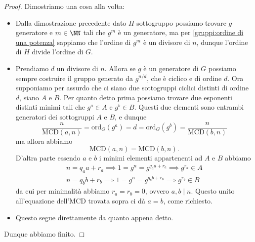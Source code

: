 \documentclass[11pt]{scrartcl}
\newcommand{\MCD}{\text{MCD}}
\newcommand{\ordine}[2]{\text{ord}_{#1}\left(#2\right)}
\begin{document}
	\begin{proof}
		Dimostriamo una cosa alla volta:
		\begin{itemize}
			\item Dalla dimostrazione precedente dato $H$ sottogruppo possiamo trovare $g$ generatore e $m\in\NN$ tali che $g^m$ è un generatore, ma per \ref{gruppi:ordine di una potenza} sappiamo che l'ordine di $g^m$ è un divisore di $n$, dunque l'ordine di $H$ divide l'ordine di $G$.
			\item Prendiamo $d$ un divisore di $n$. Allora se $g$ è un generatore di $G$ possiamo sempre costruire il gruppo generato da $g^{n/d}$, che è ciclico e di ordine $d$. Ora supponiamo per assurdo che ci siano due sottogruppi ciclici distinti di ordine $d$, siano $A$ e $B$. Per quanto detto prima possiamo trovare due esponenti distinti minimi tali che $g^a\in A$ e $g^b\in B$. Questi due elementi sono entrambi generatori dei sottogruppi $A$ e $B$, e dunque
			$$\frac{n}{\MCD(a,n)}=\ordine{G}{g^a}=d=\ordine{G}{g^b}=\frac{n}{\MCD(b,n)}$$
			ma allora abbiamo
			$$\MCD(a,n)=\MCD(b,n).$$
			D'altra parte essendo $a$ e $b$ i minimi elementi appartenenti ad $A$ e $B$ abbiamo
			\begin{gather*}
				n=q_aa+r_a \implies 1=g^n=g^{q_aa+r_a} \implies g^{r_a}\in A \\
				n=q_bb+r_b \implies 1=g^n=g^{q_bb+r_b} \implies g^{r_b}\in B
			\end{gather*}
			da cui per minimalità abbiamo $r_a=r_b=0$, ovvero $a,b\mid n$. Questo unito all'equazione dell'MCD trovata sopra ci dà $a=b$, come richiesto. 
			\item Questo segue direttamente da quanto appena detto.
		\end{itemize}
		Dunque abbiamo finito.
	\end{proof}
	
\end{document}
